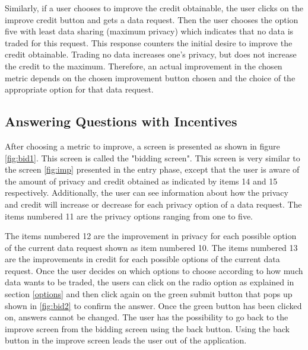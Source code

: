 Similarly, if a user chooses to improve the credit obtainable, the user clicks on the improve credit button and gets a data request. Then the user chooses the option five with least data sharing (maximum privacy) which indicates that no data is traded for this request. This response counters the initial desire to improve the credit obtainable. Trading no data increases one's privacy, but does not increase the credit to the maximum. Therefore, an actual improvement in the chosen metric depends on the chosen improvement button chosen and the choice of the appropriate option for that data request.

\subsection{Answering Questions with Incentives}

After choosing a metric to improve, a screen is presented as shown in figure \ref{fig:bid1}.
This screen is called the "bidding screen". This screen is very similar to the screen \ref{fig:imp} presented in the entry phase, except that the user
is aware of the amount of privacy and credit obtained as indicated by items 14 and 15 respectively. Additionally, the user can see information about how the privacy and credit will increase or decrease for each privacy option of a data request. The items numbered 11 are the privacy options ranging from one to five.

The items numbered 12 are the improvement in privacy for each possible option of the current data request shown as item numbered 10. The items numbered 13 are the improvements in credit for each possible options of the current data request. Once the user decides on which options to choose according to how much data wants to be traded, the users can click on the radio option as explained in section \ref{options} and then click again on the green submit button that pops up shown in \ref{fig:bid2} to confirm the answer. Once the green button has been clicked on, answers cannot be changed. The user has the possibility to go back to the improve screen from the bidding screen using the back button. Using the back button in the improve screen leads the user out of the application.

